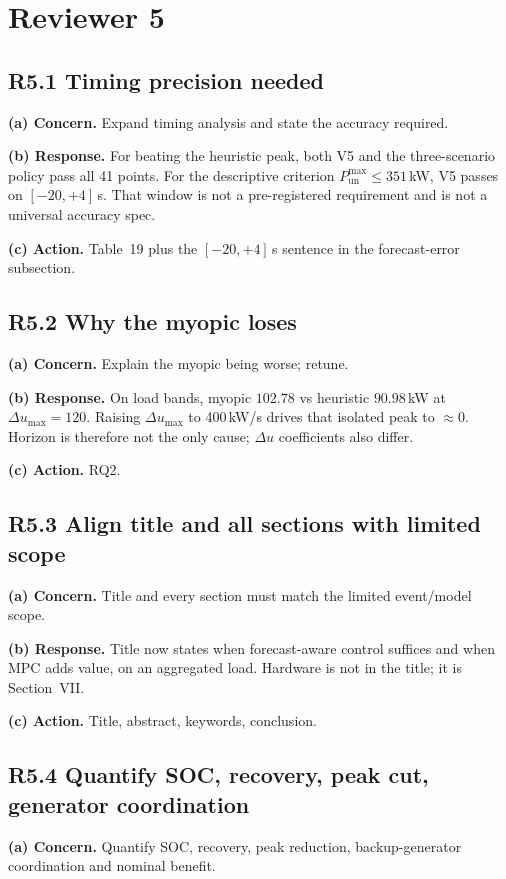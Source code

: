 \documentclass[11pt]{article}
\begin{document}
\section*{Reviewer 5}

\subsection*{R5.1 Timing precision needed}
\textbf{(a) Concern.} Expand timing analysis and state the accuracy required.

\textbf{(b) Response.} For beating the heuristic peak, both V5 and the three-scenario policy pass all 41 points. For the descriptive criterion $P_{\mathrm{un}}^{\max}\le 351$\,kW, V5 passes on $[-20,+4]$\,s. That window is not a pre-registered requirement and is not a universal accuracy spec.

\textbf{(c) Action.} Table~19 plus the $[-20,+4]$\,s sentence in the forecast-error subsection.

\subsection*{R5.2 Why the myopic loses}
\textbf{(a) Concern.} Explain the myopic being worse; retune.

\textbf{(b) Response.} On load bands, myopic $102.78$ vs heuristic $90.98$\,kW at $\Delta u_{\max}=120$. Raising $\Delta u_{\max}$ to 400\,kW/s drives that isolated peak to $\approx 0$. Horizon is therefore not the only cause; $\Delta u$ coefficients also differ.

\textbf{(c) Action.} RQ2.

\subsection*{R5.3 Align title and all sections with limited scope}
\textbf{(a) Concern.} Title and every section must match the limited event/model scope.

\textbf{(b) Response.} Title now states when forecast-aware control suffices and when MPC adds value, on an aggregated load. Hardware is not in the title; it is Section~VII.

\textbf{(c) Action.} Title, abstract, keywords, conclusion.

\subsection*{R5.4 Quantify SOC, recovery, peak cut, generator coordination}
\textbf{(a) Concern.} Quantify SOC, recovery, peak reduction, backup-generator coordination and nominal benefit.
\end{document}
